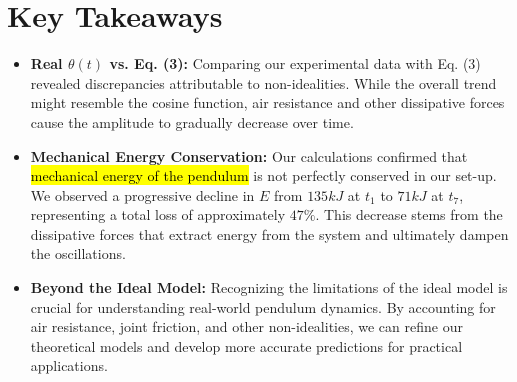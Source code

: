 \section{Key Takeaways}

\begin{itemize}
	\item \textbf{Real $\theta (t)$ vs. Eq. (3):} Comparing our experimental data with Eq. (3) revealed discrepancies attributable to non-idealities. While the overall trend might resemble the cosine function, air resistance and other dissipative forces cause the amplitude to gradually decrease over time.
	\item \textbf{Mechanical Energy Conservation:} Our calculations confirmed that \hl{mechanical energy of the pendulum} is not perfectly conserved in our set-up. We observed a progressive decline in $E$ from $135kJ$ at $t_{1}$ to $71kJ$ at $t_{7}$, representing a total loss of approximately $47\%$. This decrease stems from the dissipative forces that extract energy from the system and ultimately dampen the oscillations.
	\item \textbf{Beyond the Ideal Model:} Recognizing the limitations of the ideal model is crucial for understanding real-world pendulum dynamics. By accounting for air resistance, joint friction, and other non-idealities, we can refine our theoretical models and develop more accurate predictions for practical applications.
\end{itemize}
